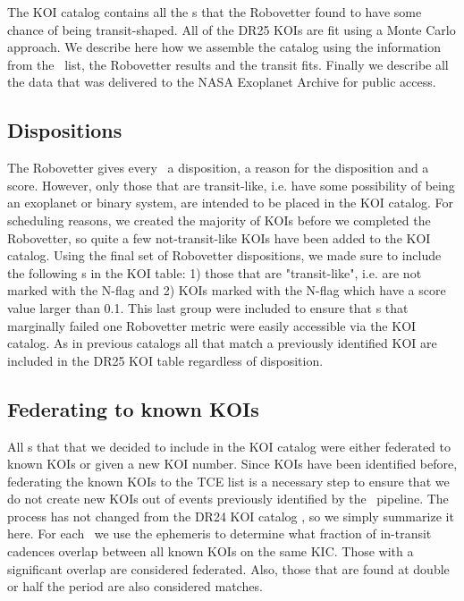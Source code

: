 The KOI catalog contains all the \opstce s that the Robovetter found to have some chance of being transit-shaped. All of the DR25 KOIs are fit using a Monte Carlo approach. We describe here how we assemble the catalog using the information from the \opstce\ list, the Robovetter results and the transit fits. Finally we describe all the data that was delivered to the NASA Exoplanet Archive for public access.
\label{koisec}

\subsection{Dispositions}
The Robovetter gives every \opstce\ a disposition, a reason for the disposition and a score.  However, only those that are transit-like, i.e. have some possibility of being an exoplanet or binary system, are intended to be placed in the KOI catalog. For scheduling reasons, we created the majority of KOIs before we completed the Robovetter, so quite a few not-transit-like KOIs have been added to the KOI catalog. Using the final set of Robovetter dispositions, we made sure to include the following \opstce s in the KOI table: 1) those that are "transit-like", i.e. are not marked with the N-flag and 2) KOIs marked with the N-flag which have a score value larger than 0.1.  This last group were included to ensure that \opstce s that marginally failed one Robovetter metric were easily accessible via the KOI catalog. As in previous catalogs all  that match a previously identified KOI are included in the DR25 KOI table regardless of disposition.


\subsection{Federating to known KOIs}
All \opstce s that that we decided to include in the KOI catalog were either federated to known KOIs or given a new KOI number. Since KOIs have been identified before, federating the known KOIs to the TCE list is a necessary step to ensure that we do not create new KOIs out of events previously identified by the \Kepler\ pipeline.  The process has not changed from the  DR24 KOI catalog \citep{Coughlin2016}, so we simply summarize it here.  For each \opstce\ we use the ephemeris to determine what fraction of in-transit cadences overlap between all known KOIs on the same KIC.  Those with a significant overlap are considered federated.  Also, those that are found at double or half the period are also considered matches.  

